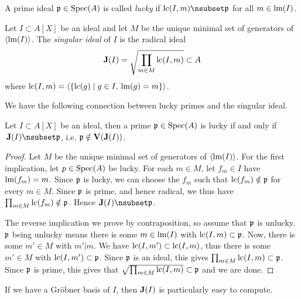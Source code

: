 \begin{definition}\label{def:lucky}
  A prime ideal $\mathfrak p \in \operatorname{Spec}(A)$ is called \textit{lucky} if $\LC(I, m) \nsubset \p$ for all $m \in \operatorname{lm}(I)$.
\end{definition}

\begin{definition}
  Let $I \subset A[X]$ be an ideal and let $M$ be the unique minimal set of generators of $\langle \operatorname{lm}(I) \rangle$. The \textit{singular ideal} of $I$ is the radical ideal
  \[\operatorname{\mathbf J}(I) = \sqrt{\prod_{m \in M} \operatorname{lc}(I, m)} \subset A\]
  where $\operatorname{lc}(I, m) = \langle \{\operatorname{lc}(g) \mid g \in I,\, \operatorname{lm}(g) = m\} \rangle$.
\end{definition}

We have the following connection between lucky primes and the singular ideal.

\begin{lemma}\label{lem:lucky_iff_not_singular}
  Let $I \subset A[X]$ be an ideal, then a prime $\mathfrak p \in \operatorname{Spec}(A)$ is lucky if and only if $\,\J(I) \nsubset \p$, i.e. $\mathfrak p \notin \operatorname{\mathbf V}(\operatorname{\mathbf J}(I))$.
\end{lemma}
\begin{proof}
  Let $M$ be the unique minimal set of generators of $\langle \operatorname{lm}(I) \rangle$. For the first implication, let $p \in \operatorname{Spec}(A)$ be lucky. For each $m \in M$, let $f_{m} \in I$ have $\operatorname{lm}(f_{m}) = m$. Since $\mathfrak p$ is lucky, we can choose the $f_{m}$ such that $\operatorname{lc}(f_{m}) \notin \mathfrak p$ for every $m \in M$. Since $\mathfrak p$ is prime, and hence radical, we thus have $\prod_{m \in M} \operatorname{lc}(f_{m}) \notin \mathfrak p$. Hence $\J(I) \nsubset \p$.

  The reverse implication we prove by contraposition, so assume that $\mathfrak p$ is unlucky. $\mathfrak p$ being unlucky means there is some $m \in \operatorname{lm}(I)$ with $\operatorname{lc}(I, m) \subset \mathfrak p$. Now, there is some $m' \in M$ with $m' | m$. We have $\operatorname{lc}(I, m') \subset \operatorname{lc}(I, m)$, thus there is some $m' \in M$ with $\operatorname{lc}(I, m') \subset \mathfrak p$. Since $\mathfrak p$ is an ideal, this gives $\prod_{m \in M} \operatorname{lc}(I, m) \subset \mathfrak p$. Since $\mathfrak p$ is prime, this gives that $\sqrt{\prod_{m \in M} \operatorname{lc}(I, m)} \subset \mathfrak p$ and we are done.
\end{proof}



If we have a Gröbner basis of $I$, then $\operatorname{\mathbf J}(I)$ is particularly easy to compute.

